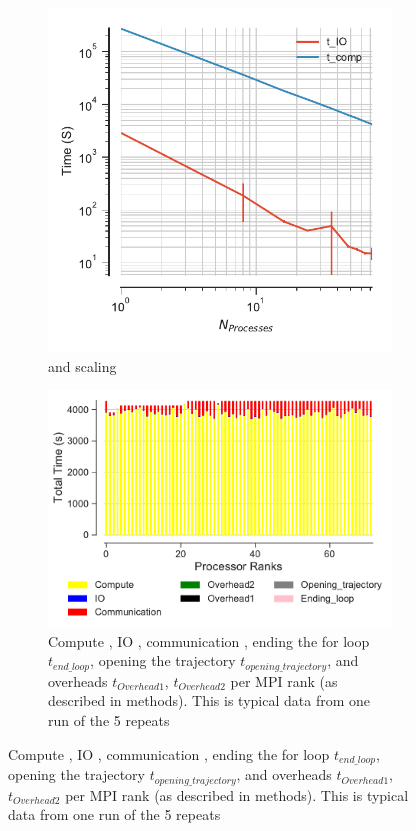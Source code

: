 \begin{figure}[ht!]
\begin{subfigure} {0.4\textwidth}
  \includegraphics[width=\linewidth]{figures/main-dihed-time_comp_IO_comparison.pdf}
\caption{\tcomp and \tIO scaling}
\label{fig:ScalingComputeIO-dihed}
\end{subfigure}
\hfill
\begin{subfigure} {.5\textwidth}
  \includegraphics[width=\linewidth]{figures/main-dihedral-BarPlot-rank-comparison_72_5.pdf}
  \caption{Compute \tcomp, IO \tIO, communication \tcomm, ending the for loop $t_{end\_loop}$,
  opening the trajectory $t_{opening\_trajectory}$, and overheads $t_{Overhead1}$,  $t_{Overhead2}$ per MPI rank (as described in methods).
  This is typical data from one run of the 5 repeats}
  \label{fig:MPIranks-dihed}
\end{subfigure}


\end{figure}
